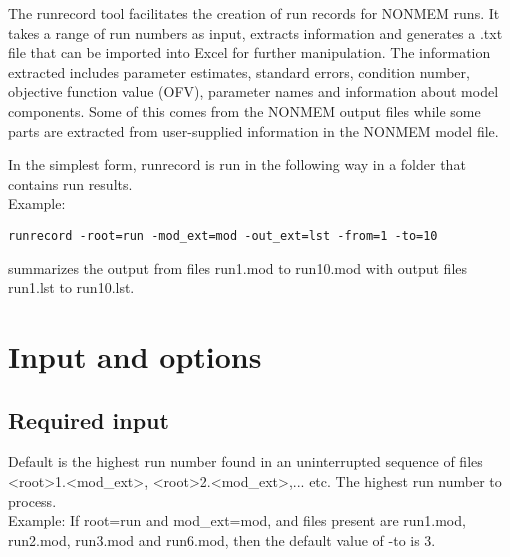 



\maketitle

The runrecord tool facilitates the creation of run records for NONMEM runs. It takes a range of run numbers as input, extracts information and generates a .txt file that can be imported into Excel for further manipulation. The information extracted includes parameter estimates, standard errors, condition number, objective function value (OFV), parameter names and information about model components. Some of this comes from the NONMEM output files while some parts are extracted from user-supplied information in the NONMEM model file. 

In the simplest form, runrecord is run in the following way in a folder that contains run results.\\
Example:
\begin{verbatim}
runrecord -root=run -mod_ext=mod -out_ext=lst -from=1 -to=10
\end{verbatim}
summarizes the output from files run1.mod to run10.mod with output files run1.lst to run10.lst.
\newpage

\section{Input and options}
\subsection{Required input}
\begin{optionlist}
Default is the highest run number found in an uninterrupted sequence of files <root>1.<mod\_ext>, <root>2.<mod\_ext>,... etc. The highest run number to process.\\
Example: If root=run and mod\_ext=mod, and files present are run1.mod, run2.mod, run3.mod and run6.mod, then the default value of -to is 3.
\nextopt
\end{optionlist}
